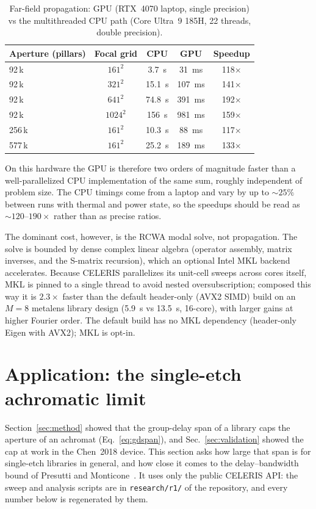 \documentclass[preprint,12pt]{elsarticle}
\begin{document}
\begin{table}[t]
\centering
\caption{Far-field propagation: GPU (RTX~4070 laptop, single precision) vs the
multithreaded CPU path (Core Ultra~9 185H, 22 threads, double precision).}
\label{tab:perf}
\begin{tabular}{lcccc}
\toprule
Aperture (pillars) & Focal grid & CPU & GPU & Speedup \\
\midrule
92\,k  & $161^2$  & 3.7~s   & 31~ms  & 118$\times$ \\
92\,k  & $321^2$  & 15.1~s  & 107~ms & 141$\times$ \\
92\,k  & $641^2$  & 74.8~s  & 391~ms & 192$\times$ \\
92\,k  & $1024^2$ & 156~s   & 981~ms & 159$\times$ \\
256\,k & $161^2$  & 10.3~s  & 88~ms  & 117$\times$ \\
577\,k & $161^2$  & 25.2~s  & 189~ms & 133$\times$ \\
\bottomrule
\end{tabular}
\end{table}

On this hardware the GPU is therefore two orders of magnitude faster than a
well-parallelized CPU implementation of the same sum, roughly independent of problem
size. The CPU timings come from a laptop and vary by up to ${\sim}25\%$ between runs with
thermal and power state, so the speedups should be read as ${\sim}120$--$190\times$
rather than as precise ratios.

The dominant cost, however, is the RCWA modal solve, not propagation. The solve is
bounded by dense complex linear algebra (operator assembly, matrix inverses, and the
S-matrix recursion), which an optional Intel MKL backend accelerates. Because CELERIS
parallelizes its unit-cell sweeps across cores itself, MKL is pinned to a single thread
to avoid nested oversubscription; composed this way it is $2.3\times$ faster than the
default header-only (AVX2 SIMD) build on an $M=8$ metalens library design
(5.9~s vs 13.5~s, 16-core), with larger
gains at higher Fourier order. The default build has no MKL dependency (header-only
Eigen with AVX2); MKL is opt-in.

\section{Application: the single-etch achromatic limit}
\label{sec:r1}
Section~\ref{sec:method} showed that the group-delay span of a library caps the
aperture of an achromat (Eq.~\eqref{eq:gdspan}), and Sec.~\ref{sec:validation} showed
the cap at work in the Chen~2018 device. This section asks how large that span is for
single-etch libraries in general, and how close it comes to the delay--bandwidth bound
of Presutti and Monticone~\cite{presutti2020}. It uses only the public CELERIS API: the
sweep and analysis scripts are in \texttt{research/r1/} of the repository, and every
number below is regenerated by them.
\end{document}
